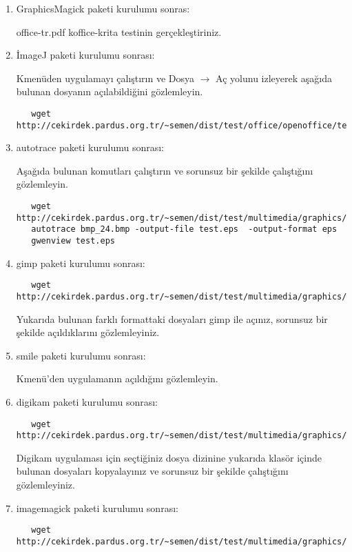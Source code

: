 \documentclass[a4paper,10pt]{article}
\begin{document}
\begin{enumerate}
 \item GraphicsMagick  paketi kurulumu sonras:

office-tr.pdf koffice-krita testinin gerçekleştiriniz.

 \item İmageJ paketi kurulumu sonrası:

 Kmenüden uygulamayı çalıştırın ve Dosya $\rightarrow$ Aç yolunu izleyerek aşağıda bulunan dosyanın açılabildiğini gözlemleyin.
  \begin{verbatim}
   wget http://cekirdek.pardus.org.tr/~semen/dist/test/office/openoffice/test_oodraw.jpg
  \end{verbatim}

\item autotrace paketi kurulumu sonrası:

Aşağıda bulunan komutları çalıştırın ve sorunsuz bir şekilde çalıştığını gözlemleyin.
  \begin{verbatim}
   wget http://cekirdek.pardus.org.tr/~semen/dist/test/multimedia/graphics/bmp_24.bmp
   autotrace bmp_24.bmp -output-file test.eps  -output-format eps
   gwenview test.eps 
  \end{verbatim}

 \item gimp paketi kurulumu sonrası:
  \begin{verbatim}
   wget http://cekirdek.pardus.org.tr/~semen/dist/test/multimedia/graphics/graphics.tar
  \end{verbatim}

 Yukarıda bulunan farklı formattaki dosyaları gimp ile açınız, sorunsuz bir şekilde açıldıklarını gözlemleyiniz.

\item smile paketi kurulumu sonrası:

Kmenü'den uygulamanın açıldığını gözlemleyin.

\item digikam paketi kurulumu sonrası:

  \begin{verbatim}
   wget http://cekirdek.pardus.org.tr/~semen/dist/test/multimedia/graphics/graphics.tar
  \end{verbatim}

 Digikam uygulaması için seçtiğiniz dosya dizinine yukarıda klasör içinde bulunan dosyaları kopyalayınız ve sorunsuz bir şekilde çalıştığını gözlemleyiniz.
\item imagemagick  paketi kurulumu sonrası:
  \begin{verbatim}
   wget http://cekirdek.pardus.org.tr/~semen/dist/test/multimedia/graphics/graphics.tar
  \end{verbatim}


\end{enumerate}
\end{document}
